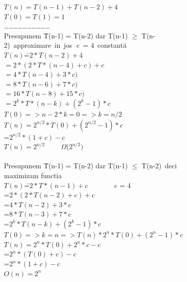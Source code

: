 \documentclass{article}
\begin{document}
{\begin{figure}[ht]
\begin{center}
\begin{tabbing}
\indent $T(n) = T(n-1) + T(n-2) +4$ \\
\indent $T(0)=T(1)=1$ \\
\indent \dots \dots \dots \dots \dots \dots \dots \dots \dots \dots 
\\
\indent Presupunem \=T(n-1) = T(n-2) dar T(n-1) $\geq$ T(n-2)\
approximare\ in\ jos\,\ c\ = 4\ constant\u a \\
\indent \>$T(n) $\==$ 2*T(n-2)+4$ \\
\indent \>\>$=2*(2*T*(n-4)+c)+c$ \\
\indent \>\>$=4*T(n-4)+3*c)$ \\
\indent \>\>$=8*T(n-6) + 7*c)$ \\
\indent \>\>$=16*T(n-8) + 15*c)$ \\
\indent \>\>$=2^k * T*(n-k) + (2^k-1)*c$ \\ 
\indent \>$T(0) => n - 2*k = 0 => k = n/2$ \\
\indent \>$T(n) = 2^{n/2} * T(0)+(2^{n/2}-1)*c$ \\
\indent \>\>=$2^{n/2}*(1+ c) -c$ \\
\indent \>$T(n) = 2^{n/2}$ \ \ \ \ $\Omega$($2^{n/2})$
\indent \\
\indent  \\
\indent Presupunem \=T(n-1) = T(n-2) dar T(n-1) $\leq$ T(n-2)\ deci maximizam functia \\ 
\indent $T(n) $\==$ 2*T*(n-1) + c$ \ \ \ \ \ \ \ c = 4 \\
\indent \>=$2*(2*T(n-2) + c) +c$ \\
\indent \>=$4*T(n-2) + 3*c$ \\
\indent \>=$8*T(n-3) + 7*c$ \\
\indent \>=$2^k*T(n-k)+(2^k-1)*c$ \\
\indent $T(0) => k=n => T(n) * 2^n*T(0)+(2^n-1)*c$ \\
\indent $T(n) = 2^n*T(0) + 2^n*c-c$ \\
\indent \>=$2^n*(T(0) + c) - c$ \\
\indent \>=$2^n*(1+c) - c $ \\
\indent $O(n) = 2^n$

\end{tabbing}
\label{fig_alg_ex}
\end{center}
\end{figure}

\begin{figure}[ht]
\begin{center}
\begin{tabbing}


\end{tabbing}
\end{center}
\end{figure}}
\end{document}
